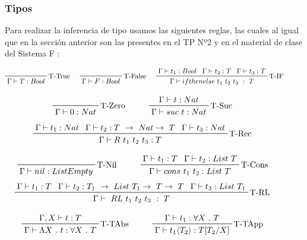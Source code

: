 \documentclass[12pt, titlepage, a4paper]{article}
\begin{document}
\subsubsection{Tipos}
Para realizar la inferencia de tipo usamos las siguientes reglas, las cuales al igual que en la sección anterior son las
presentes en el TP Nº2 \cite{tp2:lambdaCalculoSimpleTipado} y en el material de clase del Sistema F \cite{ALP:Polimorfismo}:

\begin{displaymath}
    \prftree[r]{T-True}{\Gamma \vdash T: Bool} \hspace{0.5cm}
    \prftree[r]{T-False}{\Gamma \vdash F:  Bool} \hspace{0.5cm}  
    \prftree[r]{T-IF}{\Gamma \vdash t_1 : Bool}{\Gamma \vdash t_2 : T}{\Gamma \vdash t_3 : T}{\Gamma \vdash ifthenelse \ t_1 \ t_2 \ t_3 \ : \ T} \hspace{1cm}
\end{displaymath}

\begin{displaymath}
    \prftree[r]{T-Zero}{\Gamma \vdash 0 : Nat} \hspace{1cm}
    \prftree[r]{T-Suc}{\Gamma \vdash t : Nat}{\Gamma \vdash suc \ t : Nat} \hspace{1cm}
\end{displaymath}
\begin{displaymath}
    \prftree[r]{T-Rec}{\Gamma \vdash t_1 : Nat}{\Gamma \vdash t_2 : T \ \rightarrow \ Nat \rightarrow \ T}{\Gamma \vdash t_3 : Nat}{\Gamma \vdash R \ t_1 \ t_2 \ t_3 : T} \hspace{1cm}
\end{displaymath}

\begin{displaymath}
    \prftree[r]{T-Nil}{\Gamma \vdash nil : ListEmpty} \hspace{1cm}
    \prftree[r]{T-Cons}{\Gamma \vdash t_1 : T}{\Gamma \vdash t_2 : List \ T}{\Gamma \vdash cons \ t_1 \ t_2 :  List \ T} \hspace{1cm}
\end{displaymath}
\begin{displaymath}
    \prftree[r]{T-RL}{\Gamma \vdash t_1 : T}{\Gamma \vdash t_2 : T_1 \ \rightarrow \ List \ T_1 \rightarrow \ T \rightarrow \ T}{\Gamma \vdash t_3 : List \ T_1}{\Gamma \vdash \ RL \ t_1 \ t_2 \ t_3 \ : \ T} \hspace{1cm}
\end{displaymath}

\begin{displaymath}
    \prftree[r]{T-TAbs}{\Gamma, X \vdash t : T}{\Gamma \vdash \Lambda X \ . \ t : \forall X \ . \ T} \hspace{1cm}
    \prftree[r]{T-TApp}{\Gamma \vdash t_1 : \forall X \ . \ T}{\Gamma \vdash t_1 \langle T_2 \rangle : T[T_2/X]} \hspace{1cm}
\end{displaymath}
\end{document}

